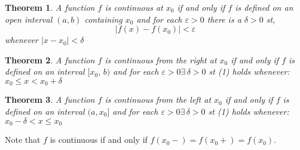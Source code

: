 \documentclass{article}
\renewcommand{\d}{\delta}
\newcommand{\e}{\varepsilon}
\newcommand{\ex}{\exists\,}
\theoremstyle{mythmstyle}
\newtheorem{theorem}{Theorem}[subsection]
\newtheorem{definition}{Definition}[subsection]
\begin{document}
\noindent{}\vspace{10pt}

\noindent{}\vspace{10pt}

\noindent{}\vspace{10pt}

\begin{theorem}
  A function $f$ is continuous at $x_0$ if and only if $f$ is defined on an open interval $(a, b)$ containing $x_0$ and for each $\e>0$ there is a $\d>0$ st,
  \begin{equation}
    |f(x) - f(x_0)| < \e
  \end{equation}
  whenever $|x - x_0| < \d$
\end{theorem}

\begin{theorem}
  A function $f$ is continuous from the right at $x_0$ if and only if $f$ is defined on an interval $[x_0,\, b)$ and for each $\e > 0\ex\d > 0$ st (1) holds whenever: $\displaystyle{x_0 \le x < x_0 + \d}$
\end{theorem}

\begin{theorem}
  A function $f$ is continuous from the left at $x_0$ if and only if $f$ is defined on an interval $(a, x_0]$ and for each $\e > 0\ex\d > 0$ st (1) holds whenever: $\displaystyle{x_0 - \d < x \le x_0}$
\end{theorem}

Note that $f$ is continuous if and only if $f(x_0-) = f(x_0+) = f(x_0)$.\\
\end{document}
